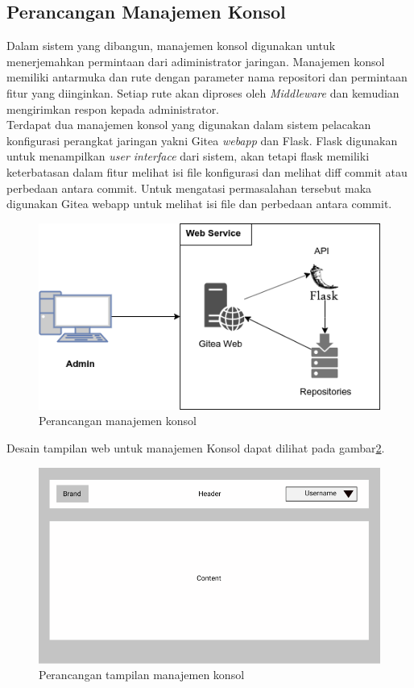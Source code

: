         \subsection{Perancangan Manajemen Konsol}
        	Dalam sistem yang dibangun, manajemen konsol digunakan untuk menerjemahkan permintaan dari adiministrator jaringan. Manajemen konsol memiliki antarmuka dan rute dengan parameter nama repositori dan permintaan fitur yang diinginkan. Setiap rute akan diproses oleh \textit{Middleware} dan kemudian mengirimkan respon kepada administrator.\\
        	\indent Terdapat dua manajemen konsol yang digunakan dalam sistem pelacakan konfigurasi perangkat jaringan yakni Gitea \textit{webapp} dan Flask. Flask digunakan untuk menampilkan \textit{user interface} dari sistem, akan tetapi flask memiliki keterbatasan dalam fitur melihat isi file konfigurasi dan melihat diff commit atau perbedaan antara commit. Untuk mengatasi permasalahan tersebut maka digunakan Gitea webapp untuk melihat isi file dan perbedaan antara commit.   
         	\begin{figure}[H]
         		\centering
         		\includegraphics[width=\textwidth]{Images/C-3/Web_Service.png}
         		\caption{Perancangan manajemen konsol}
         		\label{ManajemenKonsol}
         	\end{figure}
         	
         	Desain tampilan web untuk manajemen Konsol dapat dilihat pada gambar\ref{ManajemenKonsolUI}.
         		\begin{figure}[H]
         		\centering
         		\includegraphics[width=\textwidth]{Images/C-3/desainui.png}
         		\caption{Perancangan tampilan manajemen konsol}
         		\label{ManajemenKonsolUI}
         	\end{figure}
         
